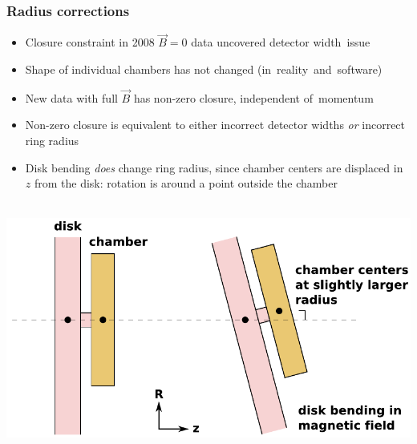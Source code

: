 \documentclass[compress]{beamer}
\begin{document}
\begin{frame}
\frametitle{Radius corrections}

\begin{itemize}
\item Closure constraint in 2008 $\vec{B}=0$ data uncovered detector \mbox{width issue\hspace{-1 cm}}
\item Shape of individual chambers has not changed \mbox{(in reality and software)\hspace{-1 cm}}
\item New data with full $\vec{B}$ has non-zero closure, independent \mbox{of momentum\hspace{-1 cm}}
\item Non-zero closure is equivalent to either incorrect detector widths {\it or} incorrect ring radius
\item Disk bending {\it does} change ring radius, since chamber
  centers are displaced in $z$ from the disk: rotation is around a
  point outside the chamber
\end{itemize}

\vspace{-0.5 cm}
\mbox{ } \hfill \includegraphics[width=0.6\linewidth]{olegs_correction.pdf} \hfill \mbox{ }
\end{frame}
\end{document}
